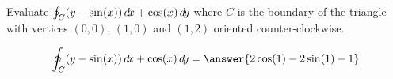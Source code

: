 \documentclass{ximera}
\author{David Guichard \and Neal Koblitz \and H. Jerome Keisler \and Albert Scheller \and Barry Balof \and Mike Wills \and Matthew Carr}
\begin{document}
\begin{exercise}




Evaluate $\oint_{C}(y-\sin(x)) \mathop{}\!d\! x+\cos(x)\mathop{}\!d\! y$ where $C$ is the boundary of the triangle with vertices $(0,0)$, $(1,0)$ and $(1,2)$ oriented counter-clockwise.
\begin{prompt}
\[
\oint_{C}(y-\sin(x)) \d x+\cos(x)\d y=\answer{2\cos(1)-2\sin(1)-1}
\]
\end{prompt}

\end{exercise}
\end{document}
